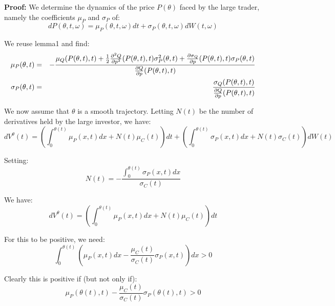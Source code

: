 \documentclass{article}
\begin{document}
\bigskip 

\textbf{Proof:} We determine the dynamics of the price $P(\theta )$ faced by
the large trader, namely the coefficients $\mu _{P}$ and $\sigma _{P}$ of:%
\begin{equation*}
dP(\theta ,t,\omega )=\mu _{P}(\theta ,t,\omega )dt+\sigma _{P}(\theta
,t,\omega )dW(t,\omega )
\end{equation*}

We reuse lemma1 and find:%
\begin{eqnarray*}
\mu _{P}(\theta ,t) &=&-\frac{\mu _{Q}(P(\theta ,t),t)+\frac{1}{2}\frac{%
\partial ^{2}Q}{\partial p^{2}}(P(\theta ,t),t)\sigma _{P}^{2}(\theta ,t)+%
\frac{\partial \sigma _{Q}}{\partial p}(P(\theta ,t),t)\sigma _{P}(\theta ,t)%
}{\frac{\partial Q}{\partial p}(P(\theta ,t),t)} \\
\sigma _{P}(\theta ,t) &=&\frac{\sigma _{Q}(P(\theta ,t),t)}{\frac{\partial Q%
}{\partial p}(P(\theta ,t),t)}
\end{eqnarray*}

We now assume that $\theta $ is a smooth trajectory. Letting $N(t)$ be the
number of derivatives held by the large investor, we have:%
\begin{equation*}
dV^{\theta }(t)=\left( \int_{0}^{\theta (t)}\mu _{P}(x,t)dx+N(t)\mu
_{C}(t)\right) dt+\left( \int_{0}^{\theta (t)}\sigma _{P}(x,t)dx+N(t)\sigma
_{C}(t)\right) dW(t)
\end{equation*}

Setting:%
\begin{equation*}
N(t)=-\frac{\int_{0}^{\theta (t)}\sigma _{P}(x,t)dx}{\sigma _{C}(t)}
\end{equation*}%
\bigskip

We have:%
\begin{equation*}
dV^{\theta }(t)=\left( \int_{0}^{\theta (t)}\mu _{P}(x,t)dx+N(t)\mu
_{C}(t)\right) dt
\end{equation*}

For this to be positive, we need:%
\begin{equation*}
\int_{0}^{\theta (t)}\left( \mu _{P}(x,t)dx-\frac{\mu _{C}(t)}{\sigma _{C}(t)%
}\sigma _{P}(x,t)\right) dx>0
\end{equation*}

Clearly this is positive if (but not only if):%
\begin{equation*}
\mu _{P}(\theta (t),t)-\frac{\mu _{C}(t)}{\sigma _{C}(t)}\sigma _{P}(\theta
(t),t)>0
\end{equation*}
\end{document}
